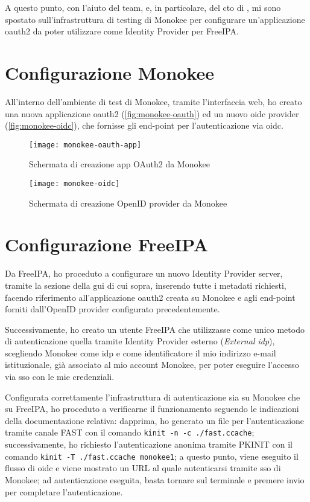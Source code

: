 A questo punto, con l'aiuto del team, e, in particolare, del \acrfull{cto} di \myAzienda, mi sono spostato sull'infrastruttura di testing di Monokee per configurare un'applicazione \acrshort{oauth2} da poter utilizzare come Identity Provider per FreeIPA.

\section{Configurazione Monokee}
All'interno dell'ambiente di test di Monokee, tramite l'interfaccia web, ho creato una nuova applicazione \acrshort{oauth2}\cite{site:oauth-flow} (\autoref{fig:monokee-oauth}) ed un nuovo \acrshort{oidc} provider (\autoref{fig:monokee-oidc}), che fornisse gli end-point per l'autenticazione via \acrshort{oidc}\cite{site:monokee-docs}.


\begin{figure}[H] 
    \centering 
    \texttt{[image: monokee-oauth-app]} 
    \caption{Schermata di creazione app OAuth2 da Monokee}
    \label{fig:monokee-oauth}
\end{figure}

\begin{figure}[H] 
    \centering 
    \texttt{[image: monokee-oidc]} 
    \caption{Schermata di creazione OpenID provider da Monokee}
    \label{fig:monokee-oidc}
\end{figure}

\section{Configurazione FreeIPA}
Da FreeIPA, ho proceduto a configurare un nuovo Identity Provider server, tramite la sezione della \acrfull{gui} di cui sopra, inserendo tutte i metadati richiesti, facendo riferimento all'applicazione \acrshort{oauth2} creata su Monokee e agli end-point forniti dall'OpenID provider configurato precedentemente.

Successivamente, ho creato un utente FreeIPA che utilizzasse come unico metodo di autenticazione quella tramite Identity Provider esterno (\emph{External \acrshort{idp}}), scegliendo Monokee come \acrshort{idp} e come identificatore il mio indirizzo e-mail istituzionale, già associato al mio account Monokee, per poter eseguire l'accesso via \acrshort{sso} con le mie credenziali\cite{site:using-ext-idp-idm}.  

Configurata correttamente l'infrastruttura di autenticazione sia su Monokee che su FreeIPA, ho proceduto a verificarne il funzionamento seguendo le indicazioni della documentazione relativa: dapprima, ho generato un file per l'autenticazione tramite canale FAST con il comando \texttt{kinit -n -c ./fast.ccache}; successivamente, ho richiesto l'autenticazione anonima tramite PKINIT con il comando \texttt{kinit -T ./fast.ccache monokee1}; a questo punto, viene eseguito il flusso di \acrshort{oidc} e viene mostrato un URL al quale autenticarsi tramite \acrshort{sso} di Monokee; ad autenticazione eseguita, basta tornare sul terminale e premere invio per completare l'autenticazione.

